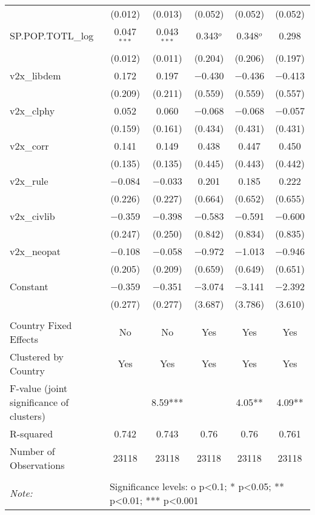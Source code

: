 \begin{tabular}{@{\extracolsep{5pt}}lccccc}
  & (0.012) & (0.013) & (0.052) & (0.052) & (0.052) \\ 
  SP.POP.TOTL\_log & 0.047$^{***}$ & 0.043$^{***}$ & 0.343$^{o}$ & 0.348$^{o}$ & 0.298 \\ 
  & (0.012) & (0.011) & (0.204) & (0.206) & (0.197) \\ 
  v2x\_libdem & 0.172 & 0.197 & $-$0.430 & $-$0.436 & $-$0.413 \\ 
  & (0.209) & (0.211) & (0.559) & (0.559) & (0.557) \\ 
  v2x\_clphy & 0.052 & 0.060 & $-$0.068 & $-$0.068 & $-$0.057 \\ 
  & (0.159) & (0.161) & (0.434) & (0.431) & (0.431) \\ 
  v2x\_corr & 0.141 & 0.149 & 0.438 & 0.447 & 0.450 \\ 
  & (0.135) & (0.135) & (0.445) & (0.443) & (0.442) \\ 
  v2x\_rule & $-$0.084 & $-$0.033 & 0.201 & 0.185 & 0.222 \\ 
  & (0.226) & (0.227) & (0.664) & (0.652) & (0.655) \\ 
  v2x\_civlib & $-$0.359 & $-$0.398 & $-$0.583 & $-$0.591 & $-$0.600 \\ 
  & (0.247) & (0.250) & (0.842) & (0.834) & (0.835) \\ 
  v2x\_neopat & $-$0.108 & $-$0.058 & $-$0.972 & $-$1.013 & $-$0.946 \\ 
  & (0.205) & (0.209) & (0.659) & (0.649) & (0.651) \\ 
  Constant & $-$0.359 & $-$0.351 & $-$3.074 & $-$3.141 & $-$2.392 \\ 
  & (0.277) & (0.277) & (3.687) & (3.786) & (3.610) \\ 
 \hline \\[-1.8ex] 
Country Fixed Effects & No & No & Yes & Yes & Yes \\ 
Clustered by Country & Yes & Yes & Yes & Yes & Yes \\ 
F-value (joint significance of clusters) &  & 8.59*** &  & 4.05** & 4.09** \\ 
R-squared & 0.742 & 0.743 & 0.76 & 0.76 & 0.761 \\ 
Number of Observations & 23118 & 23118 & 23118 & 23118 & 23118 \\ 
\hline 
\hline \\[-1.8ex] 
\textit{Note:}  & \multicolumn{5}{l}{Significance levels: o p<0.1; * p<0.05; ** p<0.01; *** p<0.001} \\ 
\end{tabular} 

